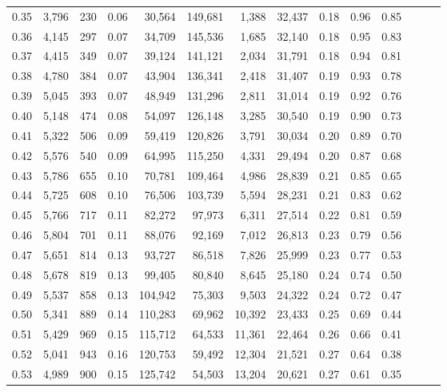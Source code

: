 \begin{tabular}{rrrrrrrrrrrrrr}
0.35 &  3,796 &    230 &  0.06 &   30,564 &  149,681 &   1,388 &  32,437 &  0.18 &  0.96 &      0.85 \\
0.36 &  4,145 &    297 &  0.07 &   34,709 &  145,536 &   1,685 &  32,140 &  0.18 &  0.95 &      0.83 \\
0.37 &  4,415 &    349 &  0.07 &   39,124 &  141,121 &   2,034 &  31,791 &  0.18 &  0.94 &      0.81 \\
0.38 &  4,780 &    384 &  0.07 &   43,904 &  136,341 &   2,418 &  31,407 &  0.19 &  0.93 &      0.78 \\
0.39 &  5,045 &    393 &  0.07 &   48,949 &  131,296 &   2,811 &  31,014 &  0.19 &  0.92 &      0.76 \\
0.40 &  5,148 &    474 &  0.08 &   54,097 &  126,148 &   3,285 &  30,540 &  0.19 &  0.90 &      0.73 \\
0.41 &  5,322 &    506 &  0.09 &   59,419 &  120,826 &   3,791 &  30,034 &  0.20 &  0.89 &      0.70 \\
0.42 &  5,576 &    540 &  0.09 &   64,995 &  115,250 &   4,331 &  29,494 &  0.20 &  0.87 &      0.68 \\
0.43 &  5,786 &    655 &  0.10 &   70,781 &  109,464 &   4,986 &  28,839 &  0.21 &  0.85 &      0.65 \\
0.44 &  5,725 &    608 &  0.10 &   76,506 &  103,739 &   5,594 &  28,231 &  0.21 &  0.83 &      0.62 \\
0.45 &  5,766 &    717 &  0.11 &   82,272 &   97,973 &   6,311 &  27,514 &  0.22 &  0.81 &      0.59 \\
0.46 &  5,804 &    701 &  0.11 &   88,076 &   92,169 &   7,012 &  26,813 &  0.23 &  0.79 &      0.56 \\
0.47 &  5,651 &    814 &  0.13 &   93,727 &   86,518 &   7,826 &  25,999 &  0.23 &  0.77 &      0.53 \\
0.48 &  5,678 &    819 &  0.13 &   99,405 &   80,840 &   8,645 &  25,180 &  0.24 &  0.74 &      0.50 \\
0.49 &  5,537 &    858 &  0.13 &  104,942 &   75,303 &   9,503 &  24,322 &  0.24 &  0.72 &      0.47 \\
0.50 &  5,341 &    889 &  0.14 &  110,283 &   69,962 &  10,392 &  23,433 &  0.25 &  0.69 &      0.44 \\
0.51 &  5,429 &    969 &  0.15 &  115,712 &   64,533 &  11,361 &  22,464 &  0.26 &  0.66 &      0.41 \\
0.52 &  5,041 &    943 &  0.16 &  120,753 &   59,492 &  12,304 &  21,521 &  0.27 &  0.64 &      0.38 \\
0.53 &  4,989 &    900 &  0.15 &  125,742 &   54,503 &  13,204 &  20,621 &  0.27 &  0.61 &      0.35 \\

\end{tabular}
